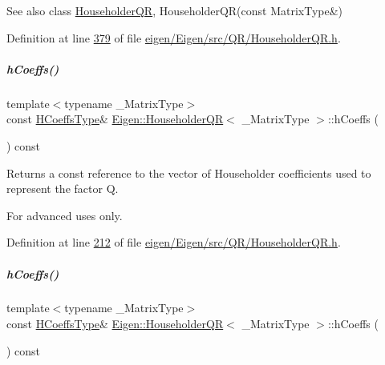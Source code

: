 \begin{DoxySeeAlso}{See also}
class \hyperlink{group___q_r___module_class_eigen_1_1_householder_q_r}{Householder\+QR}, Householder\+Q\+R(const Matrix\+Type\&) 
\end{DoxySeeAlso}


Definition at line \hyperlink{eigen_2_eigen_2src_2_q_r_2_householder_q_r_8h_source_l00379}{379} of file \hyperlink{eigen_2_eigen_2src_2_q_r_2_householder_q_r_8h_source}{eigen/\+Eigen/src/\+Q\+R/\+Householder\+Q\+R.\+h}.

\mbox{\label{group___q_r___module_ae931aa44cde62317b57a9ae661d184be}} 
\subparagraph{\texorpdfstring{h\+Coeffs()}{hCoeffs()}\hspace{0.1cm}{\footnotesize\ttfamily [1/2]}}
{\footnotesize\ttfamily template$<$typename \+\_\+\+Matrix\+Type$>$ \\
const \hyperlink{class_eigen_1_1internal_1_1_tensor_lazy_evaluator_writable}{H\+Coeffs\+Type}\& \hyperlink{group___q_r___module_class_eigen_1_1_householder_q_r}{Eigen\+::\+Householder\+QR}$<$ \+\_\+\+Matrix\+Type $>$\+::h\+Coeffs (\begin{DoxyParamCaption}{ }\end{DoxyParamCaption}) const\hspace{0.3cm}{\ttfamily [inline]}}

\begin{DoxyReturn}{Returns}
a const reference to the vector of Householder coefficients used to represent the factor {\ttfamily Q}.
\end{DoxyReturn}
For advanced uses only. 

Definition at line \hyperlink{eigen_2_eigen_2src_2_q_r_2_householder_q_r_8h_source_l00212}{212} of file \hyperlink{eigen_2_eigen_2src_2_q_r_2_householder_q_r_8h_source}{eigen/\+Eigen/src/\+Q\+R/\+Householder\+Q\+R.\+h}.

\mbox{\label{group___q_r___module_ae931aa44cde62317b57a9ae661d184be}} 
\subparagraph{\texorpdfstring{h\+Coeffs()}{hCoeffs()}\hspace{0.1cm}{\footnotesize\ttfamily [2/2]}}
{\footnotesize\ttfamily template$<$typename \+\_\+\+Matrix\+Type$>$ \\
const \hyperlink{class_eigen_1_1internal_1_1_tensor_lazy_evaluator_writable}{H\+Coeffs\+Type}\& \hyperlink{group___q_r___module_class_eigen_1_1_householder_q_r}{Eigen\+::\+Householder\+QR}$<$ \+\_\+\+Matrix\+Type $>$\+::h\+Coeffs (\begin{DoxyParamCaption}{ }\end{DoxyParamCaption}) const\hspace{0.3cm}{\ttfamily [inline]}}

